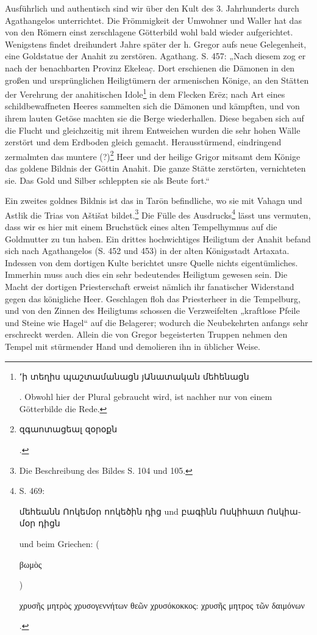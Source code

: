 \documentclass{article}
\begin{document}
Ausführlich und authentisch sind wir über den Kult des 3. Jahrhunderts durch Agathangelos unterrichtet. Die Frömmigkeit der Umwohner und Waller hat das von den Römern einst zerschlagene Götterbild wohl bald wieder aufgerichtet. Wenigstens findet dreihundert Jahre später der h. Gregor aufs neue Gelegenheit, eine Goldstatue der Anahit zu zerstören. Agathang. S. 457: „Nach diesem zog er nach der benachbarten Provinz Ekełeac̣. Dort erschienen die Dämonen in den großen und ursprünglichen Heiligtümern der armenischen Könige, an den Stätten der Verehrung der anahitischen Idole\footnote{\begin{armenian}՚ի տեղիս պաշտամանացն յԱնատական մեհենացն\end{armenian}. Obwohl hier der Plural gebraucht wird, ist nachher nur von einem Götterbilde die Rede.} in dem Flecken Erēz; nach Art eines schildbewaffneten Heeres sammelten sich die Dämonen und kämpften, und von ihrem lauten Getöse machten sie die Berge wiederhallen. Diese begaben sich auf die Flucht und gleichzeitig mit ihrem Entweichen wurden die sehr hohen Wälle zerstört und dem Erdboden gleich gemacht. Herausstürmend, eindringend zermalmten das muntere (?)\footnote{\begin{armenian}զգաոտացեալ զօրօքն\end{armenian}.} Heer und der heilige Grigor mitsamt dem Könige das goldene Bildnis der Göttin Anahit. Die ganze Stätte zerstörten, vernichteten sie. Das Gold und Silber schleppten sie als Beute fort.“

Ein zweites goldnes Bildnis ist das in Tarōn befindliche, wo sie mit Vahagn und Astłik die Trias von Aštišat bildet.\footnote{Die Beschreibung des Bildes S. 104 und 105.} Die Fülle des Ausdrucks\footnote{S. 469: \begin{armenian}մեհեանն Ոոկեմօր ոոկեծին դից und բագինն Ոսկիհատ Ոսկիամօր դիցն\end{armenian} und beim Griechen: (\begin{greek}βωμὸς\end{greek}) \begin{greek}χρυσῆς μητρὸς χρυσογεννήτων θεῶν χρυσόκοκκος: χρυσῆς μητρος τῶν δαιμόνων\end{greek}.} lässt uns vermuten, dass wir es hier mit einem Bruchstück eines alten Tempelhymnus auf die Goldmutter zu tun haben. Ein drittes hochwichtiges Heiligtum der Anahit befand sich nach Agathangelos (S. 452 und 453) in der alten Königsstadt Artaxata. Indessen von dem dortigen Kulte berichtet unsre Quelle nichts eigentümliches. Immerhin muss auch dies ein sehr bedeutendes Heiligtum gewesen sein. Die Macht der dortigen Priesterschaft erweist nämlich ihr fanatischer Widerstand gegen das königliche Heer. Geschlagen floh das Priesterheer in die Tempelburg, und von den Zinnen des Heiligtums schossen die Verzweifelten „kraftlose Pfeile und Steine wie Hagel“ auf die Belagerer; wodurch die Neubekehrten anfangs sehr erschreckt werden. Allein die von Gregor begeisterten Truppen nehmen den Tempel mit stürmender Hand und demolieren ihn in üblicher Weise.
\end{document}
